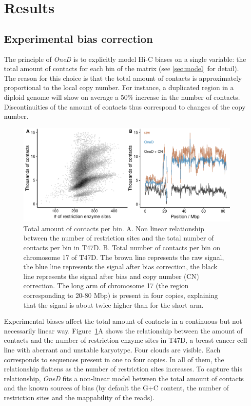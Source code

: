 \documentclass{bioinfo}
\begin{document}

\section{Results}

\subsection{Experimental bias correction}

The principle of \textit{OneD} is to explicitly model Hi-C biases on a
single variable: the total amount of contacts for each bin of the matrix
(see \ref{sec:model} for detail). The reason for this choice is that the
total amount of contacts is approximately proportional to the local copy
number. For instance, a duplicated region in a diploid genome will show on
average a 50\% increase in the number of contacts. Discontinuities of the
amount of contacts thus correspond to changes of the copy number.

\begin{figure}
\centerline{\includegraphics[width=.45\textwidth]{img/figure1.pdf}}
\caption{Total amount of contacts per bin. A. Non linear relationship
between the number of restriction sites and the total number of
contacts per bin in T47D. B. Total number of contacts per bin on
chromosome 17 of T47D. The brown line represents the raw
signal, the blue line represents the signal after bias correction, the
black line represents the signal after bias and copy number (CN) correction.
The long arm of chromosome 17 (the region corresponding to 20-80 Mbp) is
present in four copies, explaining that the signal is about twice higher
than for the short arm.}
\label{fig:totals}
\end{figure}


Experimental biases affect the total amount of contacts in a continuous
but not necessarily linear way. Figure~\ref{fig:totals}A shows the
relationship between the amount of contacts and the number of restriction
enzyme sites in T47D, a breast cancer cell line with aberrant and unstable
karyotype.  Four clouds are visible. Each corresponds to sequences present
in one to four copies. In all of them, the relationship flattens as the
number of restriction sites increases. To capture this
relationship, \textit{OneD} fits a non-linear model between the total
amount of contacts and the known sources of bias (by default the G+C
content, the number of restriction sites and the mappability of the
reads).
\end{document}
